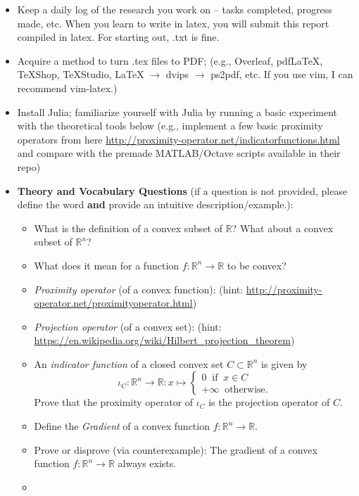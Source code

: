 \documentclass[a4paper,11pt,fleqn]{article}
\theoremstyle{plain}{\theorembodyfont{\rmfamily}%
\newtheorem{conjecture}[theorem]{Conjecture}}
\theoremstyle{plain}{\theorembodyfont{\rmfamily}%
\newtheorem{example}[theorem]{Example}}
\theoremstyle{plain}{\theorembodyfont{\rmfamily}%
\newtheorem{remark}[theorem]{Remark}}
\theoremstyle{plain}{\theorembodyfont{\rmfamily}%
\newtheorem{algorithm}[theorem]{Algorithm}}
\theoremstyle{plain}{\theorembodyfont{\rmfamily}%
\newtheorem{condition}[theorem]{Condition}}
\theoremstyle{plain}{\theorembodyfont{\rmfamily}%
\newtheorem{definition}[theorem]{Definition}}
\theoremstyle{plain}{\theorembodyfont{\rmfamily}
\newtheorem{fact}[theorem]{Fact}}
\theoremstyle{plain}{\theorembodyfont{\rmfamily}
\newtheorem{problem}[theorem]{Problem}}
\theoremstyle{plain}{\theorembodyfont{\rmfamily}
\newtheorem{notation}[theorem]{Notation}}
\theoremstyle{plain}{\theorembodyfont{\rmfamily}
\newtheorem{project}[theorem]{Project}}
\newcommand{\RR}{\ensuremath{\mathbb{R}}}
\begin{document}
\begin{itemize}
\item
Keep a daily log of the research you work on -- tasks completed,
progress made, etc. When you learn to write in latex, you will
submit this report compiled in latex. For starting out, .txt is
fine.
\item
Acquire a method to turn .tex files to PDF; (e.g., Overleaf,
pdfLaTeX, TeXShop,
TeXStudio,  LaTeX $\to$ dvips $\to$ ps2pdf, etc. If you use vim, I
can recommend vim-latex.)
\item
Install Julia; familiarize yourself with Julia by running a basic
experiment with the theoretical tools below (e.g., implement a few
basic proximity operators from here
\url{http://proximity-operator.net/indicatorfunctions.html} and
compare with the premade MATLAB/Octave scripts available in their
repo)
\item
\textbf{Theory and Vocabulary Questions} (if a question is not provided,
please define the word \textbf{and} provide an intuitive
description/example.):
\begin{itemize}
\item
What is the definition of a convex subset of $\mathbb{R}$? What
about a convex subset of $\mathbb{R}^n$?
\item
What does it mean for a function $f\colon\mathbb{R}^n\to\mathbb{R}$
to be convex?
\item
{\em Proximity operator} (of a convex function): 
(hint: \url{http://proximity-operator.net/proximityoperator.html})
\item
{\em Projection operator} (of a convex set):
(hint:
\url{https://en.wikipedia.org/wiki/Hilbert_projection_theorem})
\item
An {\em indicator function} of a closed convex set
$C\subset\mathbb{R}^n$ is given by
\begin{equation}
\iota_C\colon\RR^n\to\RR\colon x\mapsto
\begin{cases}
0\;\;\text{if}\;\;x\in C\\
+\infty\;\;\text{otherwise.}
\end{cases}
\end{equation}
Prove that the proximity operator of $\iota_C$ is the projection
operator of $C$.
\item
Define the {\em Gradient} of a convex function
$f\colon\RR^n\to\RR$.
\item
Prove or disprove (via counterexample): The gradient of a convex
function $f\colon\RR^n\to\RR$ always exists.
\item

\end{itemize}
\end{itemize}
\end{document}
